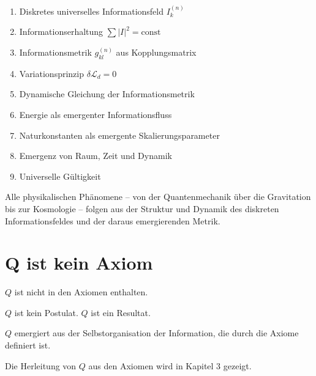 \begin{enumerate}
\item Diskretes universelles Informationsfeld \( I_k^{(n)} \)
\item Informationserhaltung \( \sum |I|^2 = \text{const} \)
\item Informationsmetrik \( g_{kl}^{(n)} \) aus Kopplungsmatrix
\item Variationsprinzip \( \delta \mathcal{L}_d = 0 \)
\item Dynamische Gleichung der Informationsmetrik
\item Energie als emergenter Informationsfluss
\item Naturkonstanten als emergente Skalierungsparameter
\item Emergenz von Raum, Zeit und Dynamik
\item Universelle Gültigkeit
\end{enumerate}

Alle physikalischen Phänomene – von der Quantenmechanik über die Gravitation bis zur Kosmologie – folgen aus der Struktur und Dynamik des diskreten Informationsfeldes und der daraus emergierenden Metrik.

\section{Q ist kein Axiom}

\( Q \) ist nicht in den Axiomen enthalten.

\( Q \) ist kein Postulat. \( Q \) ist ein Resultat.

\( Q \) emergiert aus der Selbstorganisation der Information, die durch die Axiome definiert ist.

Die Herleitung von \( Q \) aus den Axiomen wird in Kapitel 3 gezeigt.